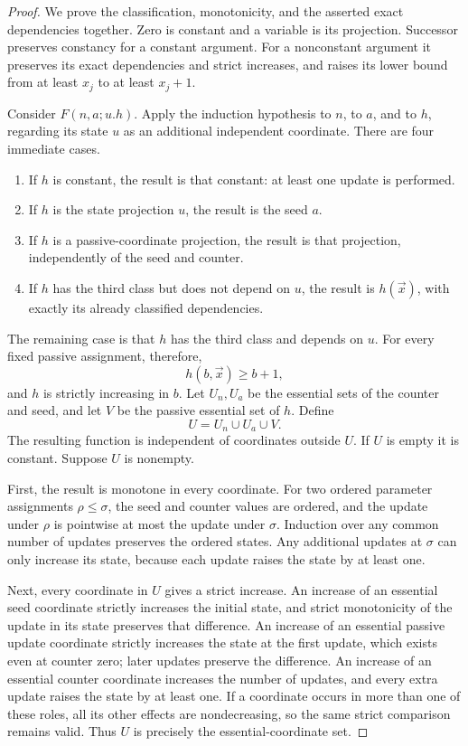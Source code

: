 \documentclass[11pt,letterpaper]{article}
\theoremstyle{definition}\newtheorem{definition}[theorem]{Definition}
\theoremstyle{remark}\newtheorem{remark}[theorem]{Remark}
\begin{document}
\begin{proof}
We prove the classification, monotonicity, and the asserted exact
dependencies together. Zero is constant and a variable is its projection.
Successor preserves constancy for a constant argument. For a nonconstant
argument it preserves its exact dependencies and strict increases, and
raises its lower bound from at least $x_j$ to at least $x_j+1$.

Consider $F(n,a;u.h)$. Apply the induction hypothesis to $n$, to $a$, and
to $h$, regarding its state $u$ as an additional independent coordinate.
There are four immediate cases.
\begin{enumerate}
\item If $h$ is constant, the result is that constant: at least one
      update is performed.
\item If $h$ is the state projection $u$, the result is the seed $a$.
\item If $h$ is a passive-coordinate projection, the result is that
      projection, independently of the seed and counter.
\item If $h$ has the third class but does not depend on $u$, the result
      is $h(\vec x)$, with exactly its already classified dependencies.
\end{enumerate}
The remaining case is that $h$ has the third class and depends on $u$.
For every fixed passive assignment, therefore,
\[
                 h(b,\vec x)\geq b+1,
\]
and $h$ is strictly increasing in $b$. Let $U_n,U_a$ be the essential
sets of the counter and seed, and let $V$ be the passive essential set of
$h$. Define
\[
                         U=U_n\cup U_a\cup V.
\]
The resulting function is independent of coordinates outside $U$.
If $U$ is empty it is constant. Suppose $U$ is nonempty.

First, the result is monotone in every coordinate. For two ordered
parameter assignments $\rho\leq\sigma$, the seed and counter values
are ordered, and the update under $\rho$ is pointwise at most the update
under $\sigma$. Induction over any common number of updates preserves
the ordered states. Any additional updates at $\sigma$ can only increase
its state, because each update raises the state by at least one.

Next, every coordinate in $U$ gives a strict increase. An increase of
an essential seed coordinate strictly increases the initial state, and
strict monotonicity of the update in its state preserves that difference.
An increase of an essential passive update coordinate strictly increases
the state at the first update, which exists even at counter zero; later
updates preserve the difference. An increase of an essential counter
coordinate increases the number of updates, and every extra update
raises the state by at least one. If a coordinate occurs in more than
one of these roles, all its other effects are nondecreasing, so the
same strict comparison remains valid. Thus $U$ is precisely the
essential-coordinate set.


\end{proof}
\end{document}
